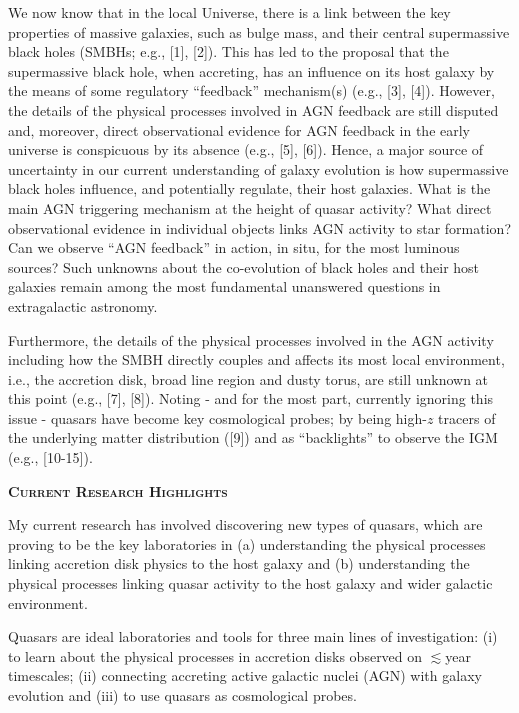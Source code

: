 \documentclass[oneside, a4paper, onecolumn, 11pt]{article}
\begin{document}
\smallskip 
\smallskip
\noindent
We now know that in the local Universe, there is a link between the
key properties of massive galaxies, such as bulge mass, and their
central supermassive black holes (SMBHs; e.g., [1], [2]). This has led
to the proposal that the supermassive black hole, when accreting, has
an influence on its host galaxy by the means of some regulatory
``feedback'' mechanism(s) (e.g., [3], [4]). However, the details of
the physical processes involved in AGN feedback are still disputed
and, moreover, direct observational evidence for AGN feedback in the
early universe is conspicuous by its absence (e.g., [5], [6]). Hence,
a major source of uncertainty in our current understanding of galaxy
evolution is how supermassive black holes influence, and potentially
regulate, their host galaxies.
What is the main AGN triggering mechanism at the height of quasar
activity? What direct observational evidence in individual objects
links AGN activity to star formation?  Can we observe ``AGN feedback''
in action, in situ, for the most luminous sources?  Such unknowns
about the co-evolution of black holes and their host galaxies remain
among the most fundamental unanswered questions in extragalactic
astronomy.

\smallskip 
\smallskip
\noindent
Furthermore, the details of the physical processes involved in the AGN
activity including how the SMBH directly couples and affects its most
local environment, i.e., the accretion disk, broad line region and
dusty torus, are still unknown at this point (e.g., [7], [8]). Noting
- and for the most part, currently ignoring this issue - quasars have
become key cosmological probes; by being high-$z$ tracers of the
underlying matter distribution ([9]) and as ``backlights'' to observe
the IGM (e.g., [10-15]).


\medskip 
\medskip
\noindent
{\bfseries \large \textsc{\textcolor{Cerulean}{Current Research Highlights}}}

\smallskip
\smallskip
\noindent
My current research has involved discovering new types of quasars,
which are proving to be the key laboratories in (a) understanding the
physical processes linking accretion disk physics to the host galaxy
and (b) understanding the physical processes linking quasar activity
to the host galaxy and wider galactic environment.

\smallskip
\smallskip
\noindent
Quasars are ideal laboratories and tools for
three main lines of investigation: {\rm (i)} to learn about the
physical processes in accretion disks observed on $\lesssim$year
timescales; {\rm (ii)} connecting accreting active galactic nuclei
(AGN) with galaxy evolution and {\rm (iii)} to use quasars as
cosmological probes. 
\end{document}
